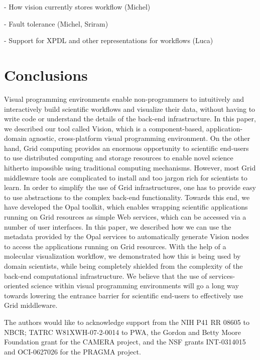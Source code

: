 \documentclass[conference]{IEEEtran}
\begin{document}
- How vision currently stores workflow (Michel)

- Fault tolerance (Michel, Sriram)

- Support for XPDL and other representations for workflows (Luca)

\section {Conclusions}

Visual programming environments enable non-programmers to intuitively and
interactively build scientific workflows and visualize their data, without
having to write code or understand the details of the back-end
infrastructure. In this paper, we described our tool called Vision, which
is a component-based, application-domain agnostic, cross-platform visual
programming environment. On the other hand, Grid computing provides an
enormous opportunity to scientific end-users to use distributed computing
and storage resources to enable novel science hitherto impossible using
traditional computing mechanisms. However, most Grid middleware tools are
complicated to install and too jargon rich for scientists to learn. In
order to simplify the use of Grid infrastructures, one has to provide easy
to use abstractions to the complex back-end functionality. Towards this
end, we have developed the Opal toolkit, which enables wrapping scientific
applications running on Grid resources as simple Web services, which can be
accessed via a number of user interfaces. In this paper, we described how
we can use the metadata provided by the Opal services to automatically
generate Vision nodes to access the applications running on Grid resources.
With the help of a molecular visualization workflow, we demonstrated how
this is being used by domain scientists, while being completely shielded
from the complexity of the back-end computational infrastructure. We
believe that the use of services-oriented science within visual programming
environments will go a long way towards lowering the entrance barrier for
scientific end-users to effectively use Grid middleware.

The authors would like to acknowledge support from the NIH P41 RR 08605 to
NBCR; TATRC W81XWH-07-2-0014 to PWA, the Gordon and Betty Moore Foundation
grant for the CAMERA project, and the NSF grants INT-0314015 and
OCI-0627026 for the PRAGMA project. 




\end{document}
